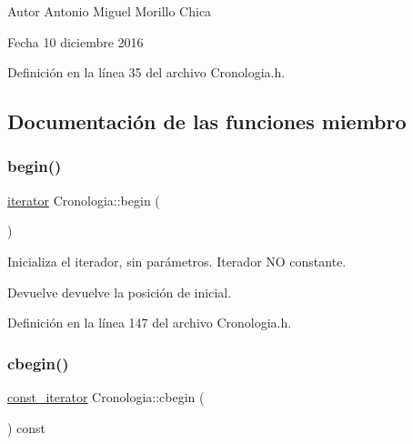 \begin{DoxyAuthor}{Autor}
Antonio Miguel Morillo Chica 
\end{DoxyAuthor}
\begin{DoxyDate}{Fecha}
10 diciembre 2016 
\end{DoxyDate}


Definición en la línea 35 del archivo Cronologia.\+h.



\subsection{Documentación de las funciones miembro}
\hypertarget{classCronologia_afee920b0ed7aff63cc14fad990c85595}{}\label{classCronologia_afee920b0ed7aff63cc14fad990c85595} 
\subsubsection{\texorpdfstring{begin()}{begin()}}
{\footnotesize\ttfamily \hyperlink{classCronologia_1_1iterator}{iterator} Cronologia\+::begin (\begin{DoxyParamCaption}{ }\end{DoxyParamCaption})\hspace{0.3cm}{\ttfamily [inline]}}



Inicializa el iterador, sin parámetros. Iterador NO constante. 

\begin{DoxyReturn}{Devuelve}
devuelve la posición de inicial. 
\end{DoxyReturn}


Definición en la línea 147 del archivo Cronologia.\+h.

\hypertarget{classCronologia_a7457f94493f66fdd906f9c2cae44732b}{}\label{classCronologia_a7457f94493f66fdd906f9c2cae44732b} 
\subsubsection{\texorpdfstring{cbegin()}{cbegin()}}
{\footnotesize\ttfamily \hyperlink{classCronologia_1_1const__iterator}{const\+\_\+iterator} Cronologia\+::cbegin (\begin{DoxyParamCaption}{ }\end{DoxyParamCaption}) const\hspace{0.3cm}{\ttfamily [inline]}}



